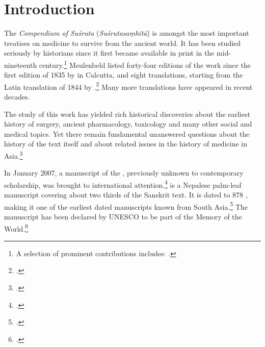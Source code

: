 \section{Introduction}


The \emph{Compendium of Suśruta} (\emph{Suśrutasaṃhitā}) is amongst the most
important treatises on medicine to survive from the ancient world. It has been
studied seriously by historians since it first became available in print in the
mid-nineteenth century.\footnote{A selection of prominent contributions includes:
    \cite{hoer-1897,hoer-1906a,hoer-1906b,hoer-1907a,hoer-1907,stra-1934,
        sing-1972a,shar-1975, ray-1980, adri-1984,
        yano-1986,meul-hist,shar-1999,vali-2007}.} %
Meulenbeld listed forty-four editions of the work since the first edition of 1835
by \citeauthor{gupt-1835} in Calcutta, and eight translations, starting from the
Latin translation of 1844 by \citeauthor{hess-1855}.\footcite[IB,
311\,ff.]{meul-hist}   Many more translations have appeared in recent decades.

The study of this work has yielded rich historical discoveries about 
the earliest history of surgery, ancient pharmacology, toxicology and many other 
social and medical topics. Yet there remain fundamental unanswered questions 
about the history of the text itself and about related issues in the history of 
medicine in Asia.\footcite[IA, 203–389]{meul-hist}

In January 2007, a manuscript of the \SS, previously unknown to contemporary
scholarship, was brought to international attention.\footcite{dimi-kais}
 is a Nepalese palm-leaf manuscript covering about two
thirds of the Sanskrit text. It is dated to 878 \CE, making it one of the
earliest dated manuscripts known from South Asia.\footcite[87–88]{hari-2011} The
manuscript has been declared by UNESCO to be part of the Memory of the 
World.\footcite{unes-2013}

